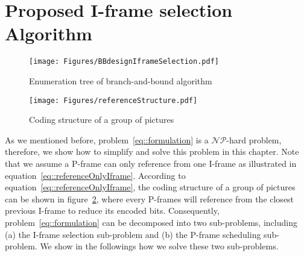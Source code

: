 \section{Proposed I-frame selection Algorithm}
\label{sec::schedulingAlgorithm}
\begin{figure}
\begin{center}
\texttt{[image: Figures/BBdesignIframeSelection.pdf]}
\caption{\label{fig::BBdesgin}Enumeration tree of branch-and-bound algorithm}
\end{center}
\end{figure}
%
\begin{figure}
\begin{center}
\texttt{[image: Figures/referenceStructure.pdf]}
\caption{\label{fig::encodeOrder}Coding structure of a group of pictures}
\end{center}
\end{figure}
As we mentioned before, problem~\eqref{eq::formulation} is a $\mathcal{NP}$-hard problem, therefore, we show how to simplify and solve this problem in this chapter.
Note that we assume a P-frame can only reference from one I-frame as illustrated in equation~\eqref{eq::referenceOnlyIframe}.
According to equation~\eqref{eq::referenceOnlyIframe}, the coding structure of a group of pictures can be shown in figure~\ref{fig::encodeOrder}, where every P-frames will reference from the closest previous I-frame to reduce its encoded bits.
Consequently, problem~\eqref{eq::formulation} can be decomposed into two sub-problems, including (a) the I-frame selection sub-problem and (b) the P-frame scheduling sub-problem.
We show in the followings how we solve these two sub-problems.

